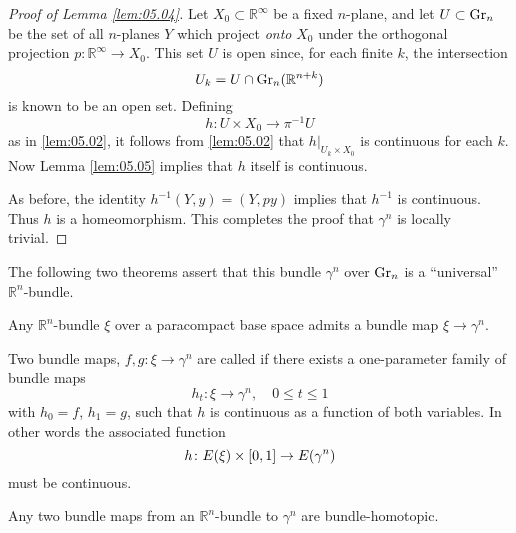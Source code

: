 \documentclass[../main]{subfiles}
\begin{document}
\begin{proof}[Proof of Lemma \ref{lem:05.04}] Let $X_0 \subset \mathbb{R}^\infty$ be a fixed $n$-plane, and let
$U \subset \operatorname{Gr}_n$ be the set of all $n$-planes $Y$ which project \emph{onto} $X_0$ under the
orthogonal projection $p\colon \mathbb{R}^\infty \to X_0$. This set $U$ is open since, for each
finite $k$, the intersection
\[
U_k=U\cap \operatorname{Gr}_n(\mathbb{R}^{n+k})
\]
is known to be an open set. Defining
\[
h\colon U\times X_0\to \pi^{-1}U
\]
as in \ref{lem:05.02}, it follows from \ref{lem:05.02} that $h|_{U_k \times X_0}$ is continuous for each $k$.
Now Lemma \ref{lem:05.05} implies that $h$ itself is continuous.

As before, the identity $h^{-1}(Y,y) = (Y,py)$ implies that $h^{-1}$ is continuous. Thus $h$ is a homeomorphism. This completes the proof that
$\gamma^n$ is locally trivial.
\end{proof}

The following two theorems assert that this bundle $\gamma^n$ over $\operatorname{Gr}_n$ is a
``universal'' $\mathbb{R}^n$-bundle.
\begin{theorem}\label{thm:05.06} Any $\mathbb{R}^n$-bundle $\xi$ over a paracompact base space admits a bundle map $\xi\to \gamma^n$.
\end{theorem}

Two bundle maps, $f, g\colon \xi\to \gamma^n$ are called  if there
exists a one-parameter family of bundle maps
\[
h_t\colon \xi\to \gamma^n, \quad 0\leq t\leq 1
\]
with $h_0 = f$, $h_1 = g$, such that $h$ is continuous as a function of both
variables. In other words the associated function
\[
h\colon E(\xi)\times [0,1]\to E(\gamma^n)
\]
must be continuous.
\begin{theorem}\label{thm:05.07} Any two bundle maps from an $\mathbb{R}^n$-bundle to $\gamma^n$
are bundle-homotopic.
\end{theorem}
\end{document}
